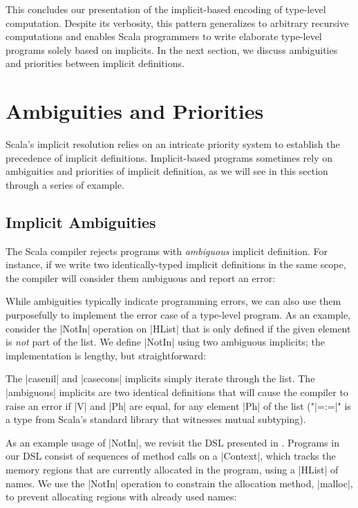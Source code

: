 \addEventListenerImplicitCall

This concludes our presentation of the implicit-based encoding of type-level computation.
Despite its verbosity, this pattern generalizes to arbitrary recursive computations and enables Scala programmers to write elaborate type-level programs solely based on implicits.
In the next section, we discuss ambiguities and priorities between implicit definitions.

\section{Ambiguities and Priorities}

Scala's implicit resolution relies on an intricate priority system to establish the precedence of implicit definitions.
Implicit-based programs sometimes rely on ambiguities and priorities of implicit definition, as we will see in this section through a series of example.

\subsection{Implicit Ambiguities}

The Scala compiler rejects programs with \emph{ambiguous} implicit definition.
For instance, if we write two identically-typed implicit definitions in the same scope, the compiler will consider them ambiguous and report an error:

\implicitAmbiguity

While ambiguities typically indicate programming errors, we can also use them purposefully to implement the error case of a type-level program.
As an example, consider the |NotIn| operation on |HList| that is only defined if the given element is \emph{not} part of the list.
We define |NotIn| using two ambiguous implicits; the implementation is lengthy, but straightforward:

\memImplicitNotIn

\noindent
The |casenil| and |casecons| implicits simply iterate through the list.
The |ambiguous| implicits are two identical definitions that will cause the compiler to raise an error if |V| and |Ph| are equal, for any element |Ph| of the list ("|=:=|" is a type from Scala's standard library that witnesses mutual subtyping).

As an example usage of |NotIn|, we revisit the DSL presented in .
Programs in our DSL consist of sequences of method calls on a |Context|, which tracks the memory regions that are currently allocated in the program, using a |HList| of names.
We use the |NotIn| operation to constrain the allocation method, |malloc|, to prevent allocating regions with already used names:

